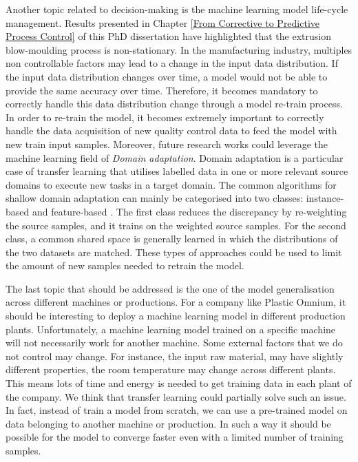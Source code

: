 Another topic related to decision-making is the machine learning model life-cycle management. Results presented in Chapter \ref{From Corrective to Predictive Process Control} of this PhD dissertation have highlighted that the extrusion blow-moulding process is non-stationary. In the manufacturing industry, multiples non controllable factors may lead to a change in the input data distribution. If the input data distribution changes over time, a model would not be able to provide the same accuracy over time. Therefore, it becomes mandatory to correctly handle this data distribution change through a model re-train process. In order to re-train the model, it becomes extremely important to correctly handle the data acquisition of new quality control data to feed the model with new train input samples. Moreover, future research works could leverage the machine learning field of \textit{Domain adaptation}. Domain adaptation is a particular case of transfer learning that utilises labelled data in one or more relevant source domains to execute new tasks in a target domain. The common algorithms for shallow domain adaptation can mainly be categorised into two classes: instance-based \citep{bruzzone2009domain,chu2013selective} and feature-based \citep{gheisari2015unsupervised, gong2013connecting, pan2010domain}. The first class reduces the discrepancy by re-weighting the source samples, and it trains on the weighted source samples. For the second class, a common shared space is generally learned in which the distributions of the two datasets are matched. These types of approaches could be used to limit the amount of new samples needed to retrain the model.

The last topic that should be addressed is the one of the model generalisation across different machines or productions. For a company like Plastic Omnium, it should be interesting to deploy a machine learning model in different production plants. Unfortunately, a machine learning model trained on a specific machine will not necessarily work for another machine. Some external factors that we do not control may change. For instance, the input raw material, may have slightly different properties, the room temperature may change across different plants. This means lots of time and energy is needed to get training data in each plant of the company. We think that transfer learning could partially solve such an issue. In fact, instead of train a model from scratch, we can use a pre-trained model on data belonging to another machine or production. In such a way it should be possible for the model to converge faster even with a limited number of training samples.     

\clearpage